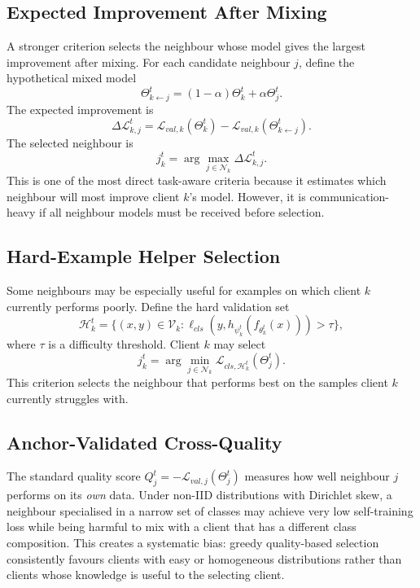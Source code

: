\documentclass[conference]{IEEEtran}
\begin{document}
\subsection{Expected Improvement After Mixing}
\label{subsec:expected-improvement-after-mixing}
A stronger criterion selects the neighbour whose model gives the largest improvement after mixing. For each candidate neighbour \(j\), define the hypothetical mixed model
\begin{equation}
    \Theta_{k\leftarrow j}^{t}
    =
    (1-\alpha)\Theta_k^t + \alpha\Theta_j^t.
    \label{eq:auto-029}
\end{equation}
The expected improvement is
\begin{equation}
    \Delta\mathcal{L}_{k,j}^{t}
    =
    \mathcal{L}_{val,k}(\Theta_k^t)
    -
    \mathcal{L}_{val,k}(\Theta_{k\leftarrow j}^{t}).
    \label{eq:auto-030}
\end{equation}
The selected neighbour is
\begin{equation}
    j_k^t = \arg\max_{j\in\mathcal{N}_k} \Delta\mathcal{L}_{k,j}^{t}.
    \label{eq:expected_improvement}
\end{equation}
This is one of the most direct task-aware criteria because it estimates which neighbour will most improve client \(k\)'s model. However, it is communication-heavy if all neighbour models must be received before selection.

\subsection{Hard-Example Helper Selection}
\label{subsec:hard-example-helper-selection}
Some neighbours may be especially useful for examples on which client \(k\) currently performs poorly. Define the hard validation set
\begin{equation}
    \mathcal{H}_k^t
    =
    \{(x,y)\in\mathcal{V}_k:
    \ell_{cls}(y,h_{\psi_k^t}(f_{\theta_k^t}(x)))>\tau\},
    \label{eq:auto-031}
\end{equation}
where \(\tau\) is a difficulty threshold. Client \(k\) may select
\begin{equation}
    j_k^t
    =
    \arg\min_{j\in\mathcal{N}_k}
    \mathcal{L}_{cls,\mathcal{H}_k^t}(\Theta_j^t).
    \label{eq:auto-032}
\end{equation}
This criterion selects the neighbour that performs best on the samples client \(k\) currently struggles with.

\subsection{Anchor-Validated Cross-Quality}
\label{subsec:anchor-validated-cross-quality}
The standard quality score \(Q_j^t = -\mathcal{L}_{val,j}(\Theta_j^t)\) measures how well neighbour \(j\) performs on its \emph{own} data. Under non-IID distributions with Dirichlet skew, a neighbour specialised in a narrow set of classes may achieve very low self-training loss while being harmful to mix with a client that has a different class composition. This creates a systematic bias: greedy quality-based selection consistently favours clients with easy or homogeneous distributions rather than clients whose knowledge is useful to the selecting client.
\end{document}
